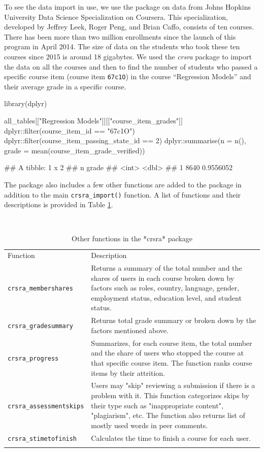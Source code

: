 To see the data import in use, we use the package on data from Johns
Hopkins University Data Science Specialization on Coursera. This
specialization, developed by Jeffrey Leek, Roger Peng, and Brian Caffo,
consists of ten courses. There has been more than two million
enrollments since the launch of this program in April 2014. The size of
data on the students who took these ten courses since 2015 is around 18
gigabytes. We used the \emph{crsra} package to import the data on all
the courses and then to find the number of students who passed a
specific course item (course item \texttt{67c1O}) in the course
``Regression Models'' and their average grade in a specific course.

\begin{Schunk}
\begin{Sinput}
library(dplyr)

all_tables[["Regression Models"]][["course_item_grades"]] %
    dplyr::filter(course_item_id == "67c1O") %
    dplyr::filter(course_item_passing_state_id == 2) %
    dplyr::summarise(n = n(), grade = mean(course_item_grade_verified))

## A tibble: 1 x 2
##      n     grade
##   <int>    <dbl>
## 1  8640 0.9556052
\end{Sinput}
\end{Schunk}

The package also includes a few other functions are added to the package
in addition to the main \texttt{crsra\_import()} function. A list of
functions and their descriptions is provided in Table
\ref{tab:functions}.

\begin{table}
\footnotesize
\caption{Other functions in the *crsra* package}\
\centering
\label{tab:functions}
\begin{tabular}{p{3cm}|p{7cm}}
Function & Description \\
\addlinespace
\toprule
\texttt{crsra\_membershares} & Returns a summary of the total number and the shares of users in each course broken down by factors such as roles, country, language, gender, employment status, education level, and student status.\\
\midrule
\texttt{crsra\_gradesummary} & Returns total grade summary or broken down by the factors mentioned above.\\
\midrule
\texttt{crsra\_progress} & Summarizes, for each course item, the total number and the share of users who stopped the course at that specific course item. The function ranks course items by their attrition.\\
\midrule
\texttt{crsra\_assessmentskips} & Users may "skip" reviewing a submission if there is a problem with it. This function categorizes skips by their type such as "inappropriate content", "plagiarism", etc. The function also returns list of mostly used words in peer comments.\\
\midrule
\texttt{crsra\_stimetofinish} & Calculates the time to finish a course for each user.\\
\addlinespace
\bottomrule
\end{tabular}
\end{table}

